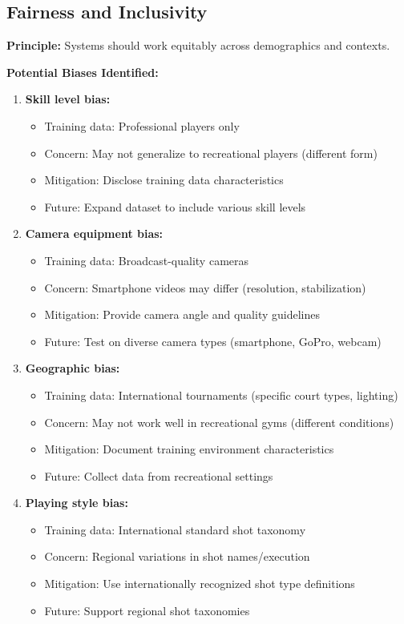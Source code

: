 \documentclass[11pt,a4paper]{article}
\begin{document}
\subsection{Fairness and Inclusivity}

\textbf{Principle:} Systems should work equitably across demographics and contexts.

\textbf{Potential Biases Identified:}

\begin{enumerate}
\item \textbf{Skill level bias:}
   \begin{itemize}
   \item Training data: Professional players only
   \item Concern: May not generalize to recreational players (different form)
   \item Mitigation: Disclose training data characteristics
   \item Future: Expand dataset to include various skill levels
   \end{itemize}

\item \textbf{Camera equipment bias:}
   \begin{itemize}
   \item Training data: Broadcast-quality cameras
   \item Concern: Smartphone videos may differ (resolution, stabilization)
   \item Mitigation: Provide camera angle and quality guidelines
   \item Future: Test on diverse camera types (smartphone, GoPro, webcam)
   \end{itemize}

\item \textbf{Geographic bias:}
   \begin{itemize}
   \item Training data: International tournaments (specific court types, lighting)
   \item Concern: May not work well in recreational gyms (different conditions)
   \item Mitigation: Document training environment characteristics
   \item Future: Collect data from recreational settings
   \end{itemize}

\item \textbf{Playing style bias:}
   \begin{itemize}
   \item Training data: International standard shot taxonomy
   \item Concern: Regional variations in shot names/execution
   \item Mitigation: Use internationally recognized shot type definitions
   \item Future: Support regional shot taxonomies
   \end{itemize}
\end{enumerate}
\end{document}
